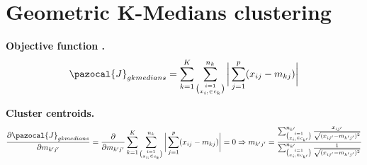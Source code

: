 \documentclass[12pt]{article}
\renewcommand\cite{\citep}  %
\newcommand{\CJ}{\pazocal{J}}
\begin{document}
\cleardoublepage	
	

\section{Geometric K-Medians clustering}

\noindent \textbf{Objective function \cite{whelan2015understanding}.}
\begin{align}\label{kmed2}
\CJ_{gkmedians} = \sum_{k=1}^{K}\sum_{\binom{i=1}{x_{i:} \in c_k}}^{n_k} \bigg{|}\sum_{j=1}^{p}(x_{ij}-m_{kj})\bigg{|}
\end{align}	

\noindent \textbf{Cluster centroids.}	
\begin{align}\label{kmed2obj}
\frac{\partial \CJ_{gkmedians}}{\partial m_{k'j'}} = \frac{\partial}{\partial m_{k'j'}} \sum_{k=1}^{K}\sum_{\binom{i=1}{x_{i:} \in c_k}}^{n_k} \bigg{|}\sum_{j=1}^{p}(x_{ij}-m_{kj})\bigg{|} = 0 
\Rightarrow
m_{k'j'} = \frac{\sum_{\binom{i=1}{x_{i:} \in c_{k'}}}^{n_{k'}} \frac{x_{ij'}}{\sqrt{(x_{ij'}-m_{k'j'})^2}}}{\sum_{\binom{i=1}{x_{i:} \in c_{k'}}}^{n_{k'}}\frac{1}{\sqrt{(x_{ij'}-m_{k'j'})^2}}}
\end{align}	
	
\end{document}
